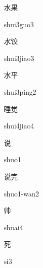 \begin{multicols*}{2}
\begin{verbete}{水果}
\begin{pronuncia}{shui3guo3}
\end{pronuncia}
\end{verbete}

\begin{verbete}{水饺}
\begin{pronuncia}{shui3jiao3}
\end{pronuncia}
\end{verbete}

\begin{verbete}{水平}
\begin{pronuncia}{shui3ping2}
\end{pronuncia}
\end{verbete}

\begin{verbete}{睡觉}
\begin{pronuncia}{shui4jiao4}
\end{pronuncia}
\end{verbete}

\begin{verbete}[shuo1]{说}
\begin{pronuncia}{shuo1}
\end{pronuncia}
\end{verbete}

\begin{verbete}{说完}
\begin{pronuncia}{shuo1-wan2}
\end{pronuncia}
\end{verbete}

\begin{verbete}[shuai4]{帅}
\begin{pronuncia}{shuai4}
\end{pronuncia}
\end{verbete}

\begin{verbete}[si3]{死}
\begin{pronuncia}{si3}
\end{pronuncia}
\end{verbete}


\end{multicols*}

